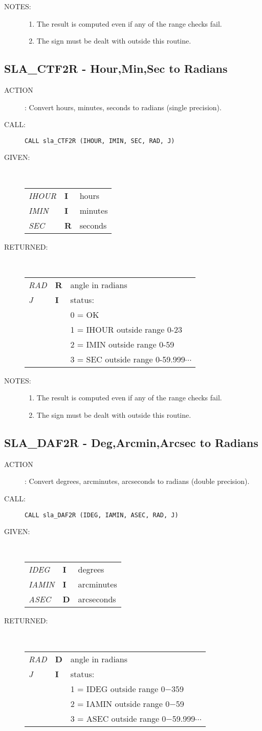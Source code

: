 \documentclass[11pt,twoside]{article}
\newcommand{\xlabel}[1]{}
\newcommand{\routine}[3]
{\hbadness=10000
  \vbox
  {
    \rule{\textwidth}{0.3mm}\\
    {\Large {\bf #1} \hfill #2 \hfill {\bf #1}}\\
    \setlength{\oldspacing}{\topsep}
    \setlength{\topsep}{0.3ex}
    \begin{description}
      #3
    \end{description}
    \setlength{\topsep}{\oldspacing}
  }
}
\renewcommand{\routine}[3]
   {
      \subsection{#1\xlabel{#1} - #2\label{#1}}
       \begin{description}
         #3
       \end{description}
   }
\newcommand{\action}[1]
{\item[ACTION]: #1}
\newcommand{\action}[1]
   {\item[ACTION:] #1}
\newcommand{\call}[1]
{\item[CALL]: \hspace{0.4em}{\tt #1}}
\newlength{\oldspacing}
\renewcommand{\call}[1]
   {
    \item[CALL:] {\tt #1}
   }
\newcommand{\args}[2]
{
  \goodbreak
  \setlength{\oldspacing}{\topsep}
  \setlength{\topsep}{0.3ex}
  \begin{description}
  \item[#1]:\\[1.5ex]
    \begin{tabular}{p{7em}p{6em}p{22em}}
      #2
    \end{tabular}
  \end{description}
  \setlength{\topsep}{\oldspacing}
}
\renewcommand{\args}[2]
   {
     \begin{description}
        \item[#1:]\\
        \begin{tabular}{p{7em}p{6em}l}
           #2
        \end{tabular}
     \end{description}
   }
\newcommand{\spec}[3]
{
  {\em {#1}} & {\bf \mbox{#2}} & {#3}
}
\newcommand{\notes}[1]
{
  \goodbreak
  \setlength{\oldspacing}{\topsep}
  \setlength{\topsep}{0.3ex}
  \begin{description}
    \item[NOTES]:
        #1
  \end{description}
  \setlength{\topsep}{\oldspacing}
}
\renewcommand{\notes}[1]
   {
      \begin{description}
         \item[NOTES:]
            #1
      \end{description}
   }
\begin{document}
\notes
{
 \begin{enumerate}
  \item The result is computed even if any of the range checks fail.
  \item The sign must be dealt with outside this routine.
 \end{enumerate}
}
\routine{SLA\_CTF2R}{Hour,Min,Sec to Radians}
{
 \action{Convert hours, minutes, seconds to radians (single precision).}
 \call{CALL sla\_CTF2R (IHOUR, IMIN, SEC, RAD, J)}
}
\args{GIVEN}
{
 \spec{IHOUR}{I}{hours} \\
 \spec{IMIN}{I}{minutes} \\
 \spec{SEC}{R}{seconds}
}
\args{RETURNED}
{
 \spec{RAD}{R}{angle in radians} \\
 \spec{J}{I}{status:} \\
 \spec{}{}{\hspace{1.5em} 0 = OK} \\
 \spec{}{}{\hspace{1.5em} 1 = IHOUR outside range 0-23} \\
 \spec{}{}{\hspace{1.5em} 2 = IMIN outside range 0-59} \\
 \spec{}{}{\hspace{1.5em} 3 = SEC outside range 0-59.999$\cdots$}
}
\notes
{
 \begin{enumerate}
  \item The result is computed even if any of the range checks fail.
  \item The sign must be dealt with outside this routine.
 \end{enumerate}
}
\routine{SLA\_DAF2R}{Deg,Arcmin,Arcsec to Radians}
{
 \action{Convert degrees, arcminutes, arcseconds to radians
  (double precision).}
 \call{CALL sla\_DAF2R (IDEG, IAMIN, ASEC, RAD, J)}
}
\args{GIVEN}
{
 \spec{IDEG}{I}{degrees} \\
 \spec{IAMIN}{I}{arcminutes} \\
 \spec{ASEC}{D}{arcseconds}
}
\args{RETURNED}
{
 \spec{RAD}{D}{angle in radians} \\
 \spec{J}{I}{status:} \\
 \spec{}{}{\hspace{1.5em} 1 = IDEG outside range 0$-$359} \\
 \spec{}{}{\hspace{1.5em} 2 = IAMIN outside range 0$-$59} \\
 \spec{}{}{\hspace{1.5em} 3 = ASEC outside range 0$-$59.999$\cdots$}
}
\end{document}
